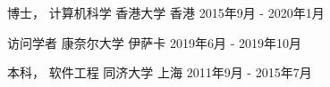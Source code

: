

\begin{cventries}


\cventry
{博士， 计算机科学} %
{香港大学} %
{香港} %
{2015年9月 - 2020年1月} %
{ %
}


\cventry
{访问学者} %
{康奈尔大学} %
{伊萨卡} %
{2019年6月 - 2019年10月} %
{ %
}


\cventry
{本科， 软件工程} %
{同济大学} %
{上海} %
{2011年9月 - 2015年7月} %
{ %
}

\end{cventries}